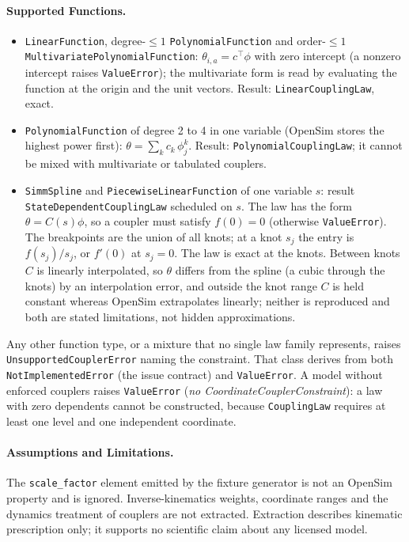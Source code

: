\paragraph{Supported Functions.}
\begin{itemize}
  \item \texttt{LinearFunction}, degree-$\le 1$ \texttt{PolynomialFunction} and
    order-$\le 1$ \texttt{MultivariatePolynomialFunction}:
    $\theta_{i,a}=c^{\top}\phi$ with zero intercept (a nonzero intercept raises
    \texttt{ValueError}); the multivariate form is read by evaluating the
    function at the origin and the unit vectors. Result:
    \texttt{LinearCouplingLaw}, exact.
  \item \texttt{PolynomialFunction} of degree 2 to 4 in one variable (OpenSim
    stores the highest power first):
    $\theta=\sum_k c_k\,\phi_j^k$. Result: \texttt{PolynomialCouplingLaw}; it
    cannot be mixed with multivariate or tabulated couplers.
  \item \texttt{SimmSpline} and \texttt{PiecewiseLinearFunction} of one
    variable $s$: result \texttt{StateDependentCouplingLaw} scheduled on $s$.
    The law has the form $\theta=C(s)\phi$, so a coupler must satisfy $f(0)=0$
    (otherwise \texttt{ValueError}). The breakpoints are the union of all
    knots; at a knot $s_j$ the entry is $f(s_j)/s_j$, or $f'(0)$ at $s_j=0$.
    The law is exact at the knots. Between knots $C$ is linearly interpolated,
    so $\theta$ differs from the spline (a cubic through the knots) by an
    interpolation error, and outside the knot range $C$ is held constant
    whereas OpenSim extrapolates linearly; neither is reproduced and both are
    stated limitations, not hidden approximations.
\end{itemize}
Any other function type, or a mixture that no single law family represents,
raises \texttt{UnsupportedCouplerError} naming the constraint. That class
derives from both \texttt{NotImplementedError} (the issue contract) and
\texttt{ValueError}. A model without enforced couplers raises
\texttt{ValueError} (\emph{no CoordinateCouplerConstraint}): a law with zero
dependents cannot be constructed, because \texttt{CouplingLaw} requires at
least one level and one independent coordinate.

\paragraph{Assumptions and Limitations.} The \texttt{scale\_factor} element
emitted by the fixture generator is not an OpenSim property and is ignored.
Inverse-kinematics weights, coordinate ranges and the dynamics treatment of
couplers are not extracted. Extraction describes kinematic prescription only;
it supports no scientific claim about any licensed model.

